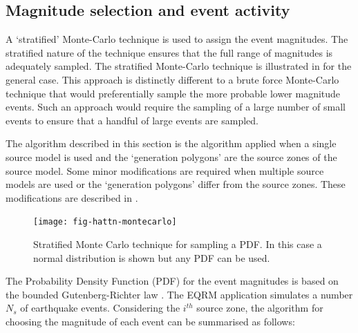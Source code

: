 \subsection{Magnitude selection and event activity}
\label{sec:magnitude_selection}

A `stratified' Monte-Carlo technique is used to assign the event
magnitudes. The stratified nature of the technique ensures that
the full range of magnitudes is adequately sampled. The stratified
Monte-Carlo technique is illustrated in
 for the general case. This approach is
distinctly different to a brute force Monte-Carlo technique that
would preferentially sample the more probable lower magnitude
events. Such an approach would require the sampling of a large
number of small events to ensure that a handful of large events
are sampled.

The algorithm described in this section is the algorithm applied
when a single source model is used and the `generation
polygons' are the source zones of the
source model. Some minor modifications are required when multiple
source models are used or the `generation
polygons' differ from the source zones.
These modifications are described in .


\begin{figure}[htp]
\texttt{[image: fig-hattn-montecarlo]}
\caption{Stratified Monte Carlo technique for sampling a PDF. In
this case a normal distribution is shown but any PDF can be used.}
\label{fig-hattn-montecarlo}
\end{figure}

The Probability Density Function (PDF) for the event magnitudes is
based on the bounded Gutenberg-Richter law \citep{dr_Kramer96a}.
The EQRM application simulates a number $N_s$ of earthquake
events. Considering the $i^{th}$ source zone, the algorithm for
choosing the magnitude of each event can be summarised as follows:


